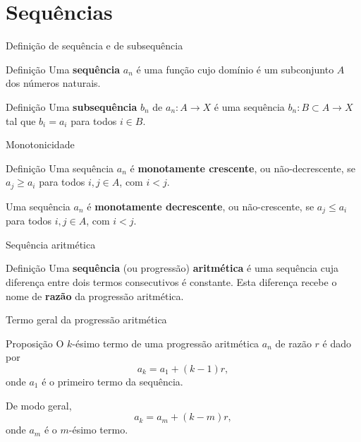 \section*{Sequências}

\begin{frame}[fragile]{Definição de sequência e de subsequência}

    \begin{block}{Definição}
        Uma \textbf{sequência} $a_n$ é uma função cujo domínio é um subconjunto $A$ dos números naturais.
    \end{block}

    \vspace{0.2in}

    \begin{block}{Definição}
        Uma \textbf{subsequência} $b_n$ de $a_n: A \to X$ é uma sequência $b_n: B\subset A \to X$ tal que $b_i = a_i$ para todos $i\in B$.
    \end{block}

\end{frame}

\begin{frame}[fragile]{Monotonicidade}

    \begin{block}{Definição}
        Uma sequência $a_n$ é \textbf{monotamente crescente}, ou não-decrescente, se $a_j \geq a_i$ para todos $i, j\in A$, com $i < j$.

        Uma sequência $a_n$ é \textbf{monotamente decrescente}, ou não-crescente, se $a_j\leq a_i$ para todos $i, j\in A$, com $i < j$.
    \end{block}

\end{frame}

\begin{frame}[fragile]{Sequência aritmética}

    \begin{block}{Definição}
        Uma \textbf{sequência} (ou progressão) \textbf{aritmética} é uma sequência cuja diferença entre dois termos consecutivos é constante. Esta diferença recebe o nome de \textbf{razão} da progressão aritmética.
    \end{block}

\end{frame}

\begin{frame}[fragile]{Termo geral da progressão aritmética}

    \begin{block}{Proposição}
        O $k$-ésimo termo de uma progressão aritmética $a_n$ de razão $r$ é dado por
        $$
            a_k = a_1 + (k - 1)r,
        $$
        onde $a_1$ é o primeiro termo da sequência.

        De modo geral,
        $$
            a_k = a_m + (k - m)r,
        $$
        onde $a_m$ é o $m$-ésimo termo.
    \end{block}

\end{frame}

